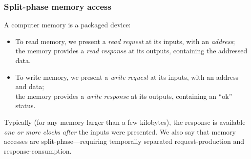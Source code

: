 \begin{frame}
\frametitle{Split-phase memory access}

\begin{center}
\end{center}

\vspace*{2ex}

A computer memory is a packaged device:
\begin{itemize}

 \item To read memory, we present a \emph{read request} at its inputs,
       with an \emph{address}; \\
       the memory provides a \emph{read response} at its outputs,
       containing the addressed data.

 \item To write memory, we present a \emph{write request} at its
       inputs, with an address and data; \\
       the memory provides a \emph{write response} at its outputs,
       containing an ``ok'' status.

\end{itemize}

\vspace*{2ex}

Typically (for any memory larger than a few kilobytes), the response
is available \emph{one or more clocks after} the inputs were
presented.  We also say that memory accesses are
\alert{split-phase}---requiring temporally separated request-production
and response-consumption.

\end{frame}






